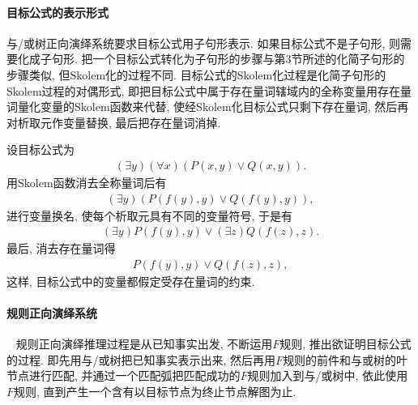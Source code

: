 \paragraph{目标公式的表示形式}
与/或树正向演绎系统要求目标公式用子句形表示. 如果目标公式不是子句形, 则需要化成子句形. 把一个目标公式转化为子句形的步骤与第3节所述的化简子句形的步骤类似, 但Skolem化的过程不同. 目标公式的Skolem化过程是化简子句形的Skolem过程的对偶形式, 即把目标公式中属于存在量词辖域内的全称变量用存在量词量化变量的Skolem函数来代替, 使经Skolem化目标公式只剩下存在量词, 然后再对析取元作变量替换, 最后把存在量词消掉.
\begin{example}
设目标公式为
\begin{align}
  (\exists  y) (\forall x) (P(x, y)\vee Q(x, y)).
\end{align}
用Skolem函数消去全称量词后有
\begin{align}
  (\exists  y)(P(f(y), y)\vee Q(f(y), y)),
\end{align}
进行变量换名, 使每个析取元具有不同的变量符号, 于是有
\begin{align}
  (\exists  y)P(f(y), y)\vee (\exists  z)Q(f(z), z).
\end{align}
最后, 消去存在量词得
\begin{align}
  P(f(y), y)\vee Q(f(z), z),
\end{align}
这样, 目标公式中的变量都假定受存在量词的约束.
\end{example}
\paragraph{规则正向演绎系统}~{}
规则正向演绎推理过程是从已知事实出发, 不断运用$F$规则, 推出欲证明目标公式的过程. 即先用与/或树把已知事实表示出来, 然后再用$F$规则的前件和与或树的叶节点进行匹配, 并通过一个匹配弧把匹配成功的$F$规则加入到与/或树中, 依此使用$F$规则, 直到产生一个含有以目标节点为终止节点解图为止.

